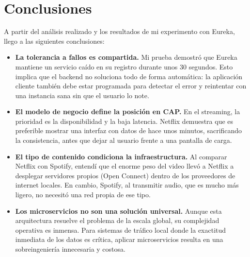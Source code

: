 \section{Conclusiones}
A partir del análisis realizado y los resultados de mi experimento con Eureka, llego a las siguientes conclusiones:

\begin{itemize}
  \item \textbf{La tolerancia a fallos es compartida.} Mi prueba demostró que Eureka mantiene un servicio caído en su registro durante unos 30 segundos. Esto implica que el backend no soluciona todo de forma automática: la aplicación cliente también debe estar programada para detectar el error y reintentar con una instancia sana sin que el usuario lo note.
  \item \textbf{El modelo de negocio define la posición en CAP.} En el streaming, la prioridad es la disponibilidad y la baja latencia. Netflix demuestra que es preferible mostrar una interfaz con datos de hace unos minutos, sacrificando la consistencia, antes que dejar al usuario frente a una pantalla de carga.
  \item \textbf{El tipo de contenido condiciona la infraestructura.} Al comparar Netflix con Spotify, entendí que el enorme peso del video llevó a Netflix a desplegar servidores propios (Open Connect) dentro de los proveedores de internet locales. En cambio, Spotify, al transmitir audio, que es mucho más ligero, no necesitó una red propia de ese tipo.
  \item \textbf{Los microservicios no son una solución universal.} Aunque esta arquitectura resuelve el problema de la escala global, su complejidad operativa es inmensa. Para sistemas de tráfico local donde la exactitud inmediata de los datos es crítica, aplicar microservicios resulta en una sobreingeniería innecesaria y costosa.
\end{itemize}
